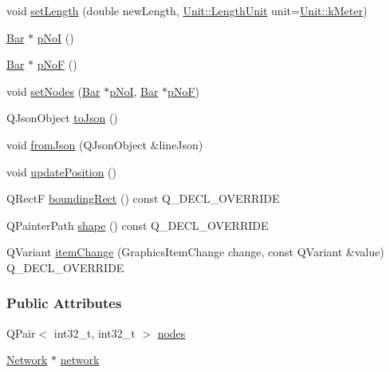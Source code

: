 \begin{DoxyCompactItemize}
\item 
void \hyperlink{group___models_ga950d0b8f5d167eda430c65ca7adadbb0}{set\+Length} (double new\+Length, \hyperlink{class_unit_a8c8921f7b225ad6063b1cb573425b9a0}{Unit\+::\+Length\+Unit} unit=\hyperlink{class_unit_a8c8921f7b225ad6063b1cb573425b9a0abfa41ebe7ee649a1f02c9b8ae570434b}{Unit\+::k\+Meter})
\item 
\hyperlink{class_bar}{Bar} $\ast$ \hyperlink{group___models_gaeafd90e84ac2f8de2a879abe9e53eef3}{p\+No\+I} ()
\item 
\hyperlink{class_bar}{Bar} $\ast$ \hyperlink{group___models_gabbc73ddedd3075c33ae5331bd7c9829f}{p\+No\+F} ()
\item 
void \hyperlink{group___models_gaeeab146e6c1d7d1a688a2764a9c9a170}{set\+Nodes} (\hyperlink{class_bar}{Bar} $\ast$\hyperlink{group___models_gaeafd90e84ac2f8de2a879abe9e53eef3}{p\+No\+I}, \hyperlink{class_bar}{Bar} $\ast$\hyperlink{group___models_gabbc73ddedd3075c33ae5331bd7c9829f}{p\+No\+F})
\item 
Q\+Json\+Object \hyperlink{group___models_ga4effa7a96db465ea6e01135d5a010739}{to\+Json} ()
\item 
void \hyperlink{group___models_ga62623ad71df5279377cc69da90decc75}{from\+Json} (Q\+Json\+Object \&line\+Json)
\item 
void \hyperlink{group___models_ga8fdb12651d4bc592616d241386b066b3}{update\+Position} ()
\item 
Q\+Rect\+F \hyperlink{group___models_gad15c3af158d3b966c04be7e18cee5aea}{bounding\+Rect} () const Q\+\_\+\+D\+E\+C\+L\+\_\+\+O\+V\+E\+R\+R\+I\+D\+E
\item 
Q\+Painter\+Path \hyperlink{group___models_gaf1736b829a643d99052ef6428ddd5b16}{shape} () const Q\+\_\+\+D\+E\+C\+L\+\_\+\+O\+V\+E\+R\+R\+I\+D\+E
\item 
Q\+Variant \hyperlink{group___models_ga5fcee3f23eb50e34f730d602a3802b93}{item\+Change} (Graphics\+Item\+Change change, const Q\+Variant \&value) Q\+\_\+\+D\+E\+C\+L\+\_\+\+O\+V\+E\+R\+R\+I\+D\+E
\end{DoxyCompactItemize}
\subsubsection*{Public Attributes}
\begin{DoxyCompactItemize}
\item 
Q\+Pair$<$ int32\+\_\+t, int32\+\_\+t $>$ \hyperlink{class_line_afd17c40d656e6a8d677cb22df5f0c70b}{nodes}
\item 
\hyperlink{class_network}{Network} $\ast$ \hyperlink{class_line_aefdf6a6c3e3775b5a16b344c1d33964e}{network}
\end{DoxyCompactItemize}
